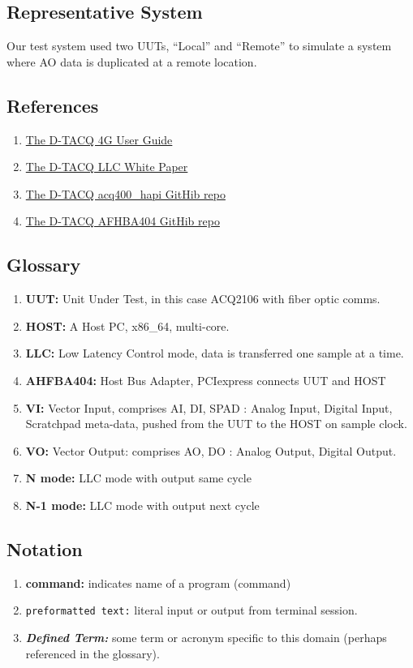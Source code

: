 \documentclass{article}
\begin{document}
\subsection{Representative System}
Our test system used two UUTs, “Local” and “Remote” to simulate a system where AO data is duplicated at a remote location.
\subsection{References}
\begin{enumerate}
	\item \href{http://www.d-tacq.com/resources/d-tacq-4G-acq4xx-UserGuide-r28.pdf}{The \mbox{D-TACQ} 4G User Guide}
	\item \href{http://www.d-tacq.com/resources/LLC_White_Paper.pdf}{The \mbox{D-TACQ} LLC White Paper}
	\item \href{https://github.com/D-TACQ/acq400_hapi}{The \mbox{D-TACQ} acq400\_hapi GitHib repo}
	\item \href{https://github.com/D-TACQ/AFHBA404}{The \mbox{D-TACQ} AFHBA404 GitHib repo}
\end{enumerate}

\subsection{Glossary}
\begin{enumerate}
	\item \textbf{UUT:} Unit Under Test, in this case ACQ2106 with fiber optic comms.
	\item \textbf{HOST:} A Host PC, x86\_64, multi-core.
	\item \textbf{LLC:} Low Latency Control mode, data is transferred one sample at a time.
	\item \textbf{AHFBA404:} Host Bus Adapter, PCIexpress connects UUT and HOST
	\item \textbf{VI:} Vector Input, comprises AI, DI, SPAD : Analog Input, Digital Input, Scratchpad meta-data, pushed from the UUT to the HOST on sample clock.
	\item \textbf{VO:} Vector Output: comprises AO, DO : Analog Output, Digital Output.
	\item \textbf{N mode:} LLC mode with output same cycle
	\item \textbf{N-1 mode:} LLC mode with output next cycle
\end{enumerate}

\subsection{Notation}
\begin{enumerate}
	\item \textbf{command:} indicates name of a program (command)
	\item \verb|preformatted text:| literal input or output from terminal session.
	\item \emph{\textbf{Defined Term:}} some term or acronym specific to this domain (perhaps referenced in the glossary).
\end{enumerate}
\end{document}
